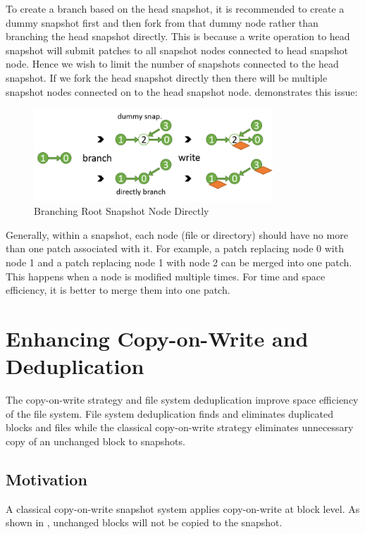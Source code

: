     To create a branch based on the head snapshot, it is recommended to create a dummy snapshot first and then fork from that dummy node rather than branching the head snapshot directly. This is because a write operation to head snapshot will submit patches to all snapshot nodes connected to head snapshot node. Hence we wish to limit the number of snapshots connected to the head snapshot. If we fork the head snapshot directly then there will be multiple snapshot nodes connected on to the head snapshot node.  demonstrates this issue:

\begin{figure}[hbtp]
\centering
\includegraphics[width=0.8\textwidth]{Chapter-4/figs/fig16.png}
\caption{Branching Root Snapshot Node Directly}
\label{fig:dummy_node}
\end{figure}

	Generally, within a snapshot, each node (file or directory) should have no more than one patch associated with it. For example, a patch replacing node 0 with node 1 and a patch replacing node 1 with node 2 can be merged into one patch. This happens when a node is modified multiple times. For time and space efficiency, it is better to merge them into one patch.
	
\section{Enhancing Copy-on-Write and Deduplication}

	The copy-on-write strategy and file system deduplication improve space efficiency of the file system. File system deduplication finds and eliminates duplicated blocks and files while the classical copy-on-write strategy eliminates unnecessary copy of an unchanged block to snapshots.

\subsection{Motivation}

    A classical copy-on-write snapshot system applies copy-on-write at block level. As shown in , unchanged blocks will not be copied to the snapshot.

